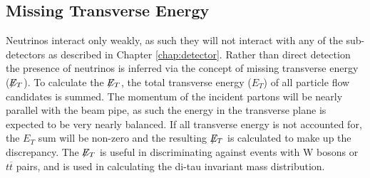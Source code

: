 \subsection{Missing Transverse Energy}
\label{sec:metselection}
Neutrinos interact only weakly, as such they will not interact with any of the sub-detectors as described in Chapter \ref{chap:detector}.
Rather than direct detection the presence of neutrinos is inferred via the concept of missing transverse energy ($\not\!\!{E}_{T}$).
To calculate the $\not\!\!{E}_{T}$, the total transverse energy ($E_{T}$) of all particle flow candidates is summed.
The momentum of the incident partons will be nearly parallel with the beam pipe, as such the energy in the transverse plane is expected to be very nearly balanced.
If all transverse energy is not accounted for, the $E_{T}$ sum will be non-zero and the resulting $\not\!\!{E}_{T}$ is calculated to make up the discrepancy.
The $\not\!\!{E}_{T}$ is useful in discriminating against events with W bosons or $t\overline{t}$ pairs, and is used in calculating the di-tau invariant mass distribution.
